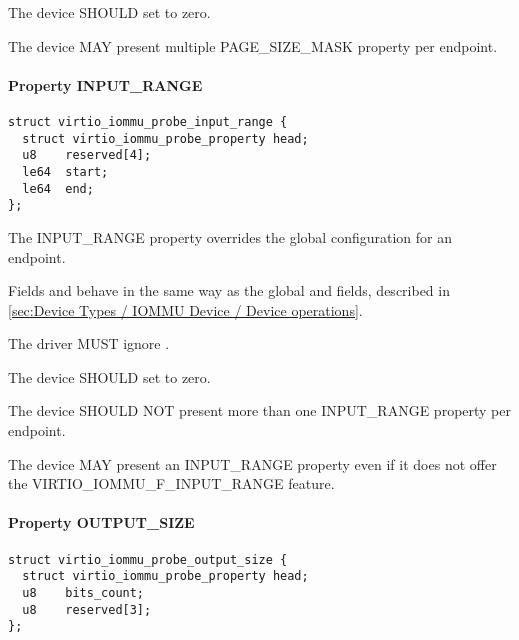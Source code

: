 The device SHOULD set  to zero.

The device MAY present multiple PAGE_SIZE_MASK property per
endpoint.


\paragraph{Property INPUT_RANGE}\label{sec:Device Types / IOMMU Device / Device operations / PROBE properties / INPUT_RANGE}

\begin{lstlisting}
struct virtio_iommu_probe_input_range {
  struct virtio_iommu_probe_property head;
  u8    reserved[4];
  le64  start;
  le64  end;
};
\end{lstlisting}

The INPUT_RANGE property overrides the global 
configuration for an endpoint.

Fields  and  behave in the same way as
the global  and 
fields, described in \ref{sec:Device Types / IOMMU Device /
Device operations}.


The driver MUST ignore .


The device SHOULD set  to zero.

The device SHOULD NOT present more than one INPUT_RANGE property
per endpoint.

The device MAY present an INPUT_RANGE property even if it does
not offer the VIRTIO_IOMMU_F_INPUT_RANGE feature.


\paragraph{Property OUTPUT_SIZE}\label{sec:Device Types / IOMMU Device / Device operations / PROBE properties / OUTPUT_SIZE}

\begin{lstlisting}
struct virtio_iommu_probe_output_size {
  struct virtio_iommu_probe_property head;
  u8	bits_count;
  u8	reserved[3];
};
\end{lstlisting}

